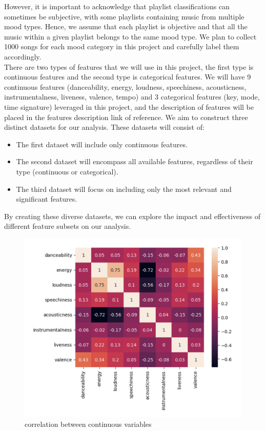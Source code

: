 \documentclass{article}
\begin{document}
However, it is important to acknowledge that playlist classifications can sometimes be subjective, with some playlists containing music from multiple mood types. Hence, we assume that each playlist is objective and that all the music within a given playlist belongs to the same mood type. We plan to collect 1000 songs for each mood category in this project and carefully label them accordingly.\\

There are two types of features that we will use in this project, the first type is continuous features and the second type is categorical features. We will have 9 continuous features (danceability, energy, loudness, speechiness, acousticness, instrumentalness, liveness, valence, tempo) and 3 categorical features (key, mode, time signature) leveraged in this project, and the description of features will be placed in the features description link of reference. 
We aim to construct three distinct datasets for our analysis. These datasets will consist of:

\begin{enumerate}
    \begin{itemize}
        \item The first dataset will include only continuous features.
        \item The second dataset will encompass all available features, regardless of their type (continuous or categorical).
        \item The third dataset will focus on including only the most relevant and significant features.
    \end{itemize}
\end{enumerate}

By creating these diverse datasets, we can explore the impact and effectiveness of different feature subsets on our analysis.

\begin{figure}[!htbp]
\centering
\includegraphics[scale=0.6]{heatmap.png}
\caption{correlation between continuous variables}
\end{figure}
\end{document}
